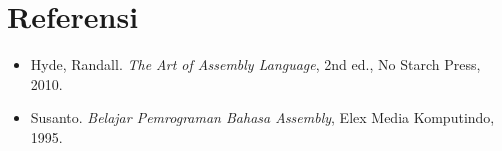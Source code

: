 \section{Referensi}
\begin{itemize}
  \item Hyde, Randall. \textit{The Art of Assembly Language}, 2nd ed., No Starch Press, 2010.
  \item Susanto. \textit{Belajar Pemrograman Bahasa Assembly}, Elex Media Komputindo, 1995.
\end{itemize}
